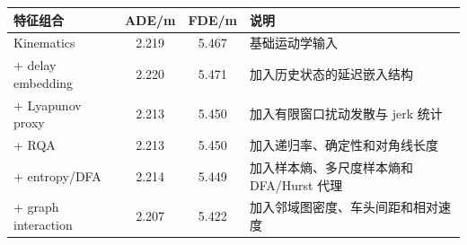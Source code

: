 \begin{tabularx}{\textwidth}{lccX}
\toprule
特征组合 & ADE/m & FDE/m & 说明 \\ 
\midrule
Kinematics & 2.219 & 5.467 & 基础运动学输入 \\ 
+ delay embedding & 2.220 & 5.471 & 加入历史状态的延迟嵌入结构 \\ 
+ Lyapunov proxy & 2.213 & 5.450 & 加入有限窗口扰动发散与 jerk 统计 \\ 
+ RQA & 2.213 & 5.450 & 加入递归率、确定性和对角线长度 \\ 
+ entropy/DFA & 2.214 & 5.449 & 加入样本熵、多尺度样本熵和 DFA/Hurst 代理 \\ 
+ graph interaction & 2.207 & 5.422 & 加入邻域图密度、车头间距和相对速度 \\ 
\bottomrule
\end{tabularx}
